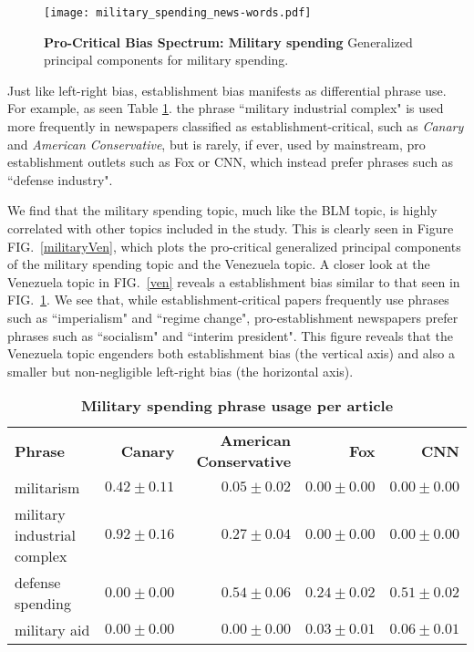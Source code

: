 \documentclass[10pt,letterpaper]{article}
\def\fig#1{FIG.~\ref{#1}}
\def\Fig#1{FIG.~\ref{#1}}
\newlength\savedwidth
\newcommand\thickhline{\noalign{\global\savedwidth\arrayrulewidth\global\arrayrulewidth 2pt}%
\hline
\noalign{\global\arrayrulewidth\savedwidth}}
\begin{document}
\begin{figure}[tb]
\caption{{\bf Pro-Critical Bias Spectrum: Military spending}
Generalized principal components for military spending.}
\hglue-5.89cm\texttt{[image: military\_spending\_news-words.pdf]}
\label{military_spending}
\end{figure}

Just like left-right bias, establishment bias manifests as differential phrase use.
For example, as seen Table \ref{ms_counts}. the phrase ``military industrial complex" is used more frequently in newspapers classified as establishment-critical, such as {\it Canary} and {\it American Conservative}, but is rarely, if ever, used by mainstream, pro establishment outlets such as Fox or CNN, which instead prefer phrases such as ``defense industry". 


We find that the military spending topic, much like the BLM topic, is highly correlated with other topics included in the study. This is clearly seen in Figure \Fig{militaryVen}, which plots the pro-critical generalized principal components of the military spending topic and the Venezuela topic. 
A closer look at the Venezuela topic in \Fig{ven} reveals a establishment bias similar to that seen in \fig{military_spending}. We see that, while establishment-critical papers frequently use phrases such as ``imperialism" and ``regime change", pro-establishment newspapers prefer phrases such as ``socialism" and ``interim president". 
This figure reveals that the Venezuela topic engenders both establishment bias (the vertical axis) and also a smaller but non-negligible left-right bias (the horizontal axis).



\begin{table}[tb]
\begin{adjustwidth}{-2.25in}{0in} 
\centering
\caption{
{\bf Military spending phrase usage per article}}
\begin{tabular}{|l|r|r|r|r|} \hline
\textbf{Phrase} & \textbf{Canary} & \textbf{American Conservative} & \textbf{Fox} &  \textbf{CNN} \\
 \thickhline
militarism &  $0.42 \pm 0.11$ & $0.05 \pm 0.02$ &  $0.00 \pm 0.00$ &  $0.00 \pm 0.00$ \\ \hline
military industrial complex &  $0.92 \pm 0.16$ & $0.27 \pm 0.04$ &  $0.00 \pm 0.00$ &  $0.00 \pm 0.00$ \\ \hline
defense spending & $0.00 \pm 0.00$ & $0.54 \pm 0.06$ &  $0.24 \pm  0.02$&  $0.51 \pm 0.02$ \\ \hline
military aid & $0.00 \pm 0.00$ & $0.00 \pm 0.00$ & $0.03 \pm 0.01$ & $0.06 \pm 0.01$\\ \hline
\end{tabular}
\label{ms_counts}
\end{adjustwidth}
\end{table}
\end{document}
